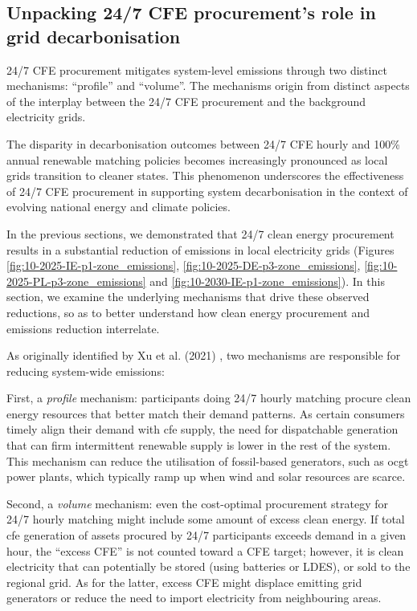 \subsection{Unpacking 24/7 CFE procurement's role in grid decarbonisation}
\label{subsec:mechanisms}

\begin{res}
    24/7 CFE procurement mitigates system-level \co \newline 
    emissions through two distinct mechanisms: \enquote{profile} and \enquote{volume}. The mechanisms origin from distinct aspects of the interplay between the 24/7 CFE procurement and the background electricity grids.
\end{res}

\begin{res}
    The disparity in decarbonisation outcomes between 24/7 CFE hourly and 100\% annual renewable matching policies becomes increasingly pronounced as local grids transition to cleaner states. This phenomenon underscores the effectiveness of 24/7 CFE procurement in supporting system decarbonisation in the context of evolving national energy and climate policies.
\end{res}

In the previous sections, we demonstrated that 24/7 clean energy procurement results in a substantial reduction of \co emissions in local electricity grids (Figures \ref{fig:10-2025-IE-p1-zone_emissions}, \ref{fig:10-2025-DE-p3-zone_emissions}, \ref{fig:10-2025-PL-p3-zone_emissions} and \ref{fig:10-2030-IE-p1-zone_emissions}).
In this section, we examine the underlying mechanisms that drive these observed reductions, so as to better understand how clean energy procurement and emissions reduction interrelate.

As originally identified by Xu et al. (2021) \cite{xu-247CFE-report}, two mechanisms are responsible for reducing system-wide emissions:

First, a \textit{profile} mechanism: participants doing 24/7 hourly matching procure clean energy resources that better match their demand patterns. 
As certain consumers timely align their demand with \gls{cfe} supply, the need for dispatchable generation that can firm intermittent renewable supply is lower in the rest of the system. 
This mechanism can reduce the utilisation of fossil-based generators, such as \gls{ocgt} power plants, which typically ramp up when wind and solar resources are scarce.

Second, a \textit{volume} mechanism: even the cost-optimal procurement strategy for 24/7 hourly matching might include some amount of excess clean energy.
If total \gls{cfe} generation of assets procured by 24/7 participants exceeds demand in a given hour, the \enquote{excess CFE} is not counted toward a CFE target; however, it is clean electricity that can potentially be stored (using batteries or LDES), or sold to the regional grid.
As for the latter, excess CFE might displace emitting grid generators or reduce the need to import electricity from neighbouring areas.

